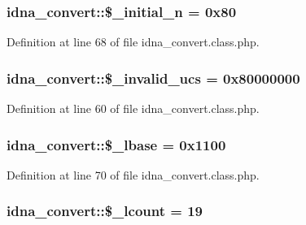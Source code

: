\subsubsection[{\texorpdfstring{\$\+\_\+initial\+\_\+n}{$_initial_n}}]{\setlength{\rightskip}{0pt plus 5cm}idna\+\_\+convert\+::\$\+\_\+initial\+\_\+n = 0x80\hspace{0.3cm}{\ttfamily [protected]}}\hypertarget{classidna__convert_a02dd88f575541a67a6312a15af340733}{}\label{classidna__convert_a02dd88f575541a67a6312a15af340733}


Definition at line 68 of file idna\+\_\+convert.\+class.\+php.

\subsubsection[{\texorpdfstring{\$\+\_\+invalid\+\_\+ucs}{$_invalid_ucs}}]{\setlength{\rightskip}{0pt plus 5cm}idna\+\_\+convert\+::\$\+\_\+invalid\+\_\+ucs = 0x80000000\hspace{0.3cm}{\ttfamily [protected]}}\hypertarget{classidna__convert_a741bab9cbe7aec53249d714143bbe53b}{}\label{classidna__convert_a741bab9cbe7aec53249d714143bbe53b}


Definition at line 60 of file idna\+\_\+convert.\+class.\+php.

\subsubsection[{\texorpdfstring{\$\+\_\+lbase}{$_lbase}}]{\setlength{\rightskip}{0pt plus 5cm}idna\+\_\+convert\+::\$\+\_\+lbase = 0x1100\hspace{0.3cm}{\ttfamily [protected]}}\hypertarget{classidna__convert_a50c50cda465aefe78b8ed69ae6cd6247}{}\label{classidna__convert_a50c50cda465aefe78b8ed69ae6cd6247}


Definition at line 70 of file idna\+\_\+convert.\+class.\+php.

\subsubsection[{\texorpdfstring{\$\+\_\+lcount}{$_lcount}}]{\setlength{\rightskip}{0pt plus 5cm}idna\+\_\+convert\+::\$\+\_\+lcount = 19\hspace{0.3cm}{\ttfamily [protected]}}\hypertarget{classidna__convert_ae191087842e21e5f56a0df02f922abbe}{}\label{classidna__convert_ae191087842e21e5f56a0df02f922abbe}


